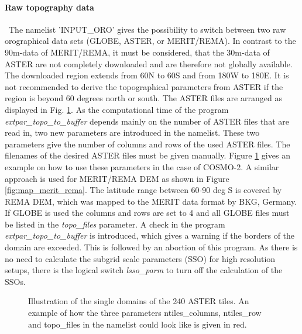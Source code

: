 \documentclass[a4paper,10pt,DIV14,BCOR1cm,titlepage,twoside]{scrartcl}
\begin{document}
\paragraph{Raw topography data}\ 
The namelist 'INPUT\_ORO' gives the possibility to switch between two raw orographical data sets (GLOBE, ASTER, or MERIT/REMA). In contrast to the 90m-data of MERIT/REMA, it must be considered, that the 30m-data of ASTER are not completely downloaded and are therefore not globally available. The downloaded region extends from 60\textdegree N to 60\textdegree S and from 180\textdegree W to 180\textdegree E. It is not recommended to derive the topographical parameters from ASTER if the region is beyond 60 degrees north or south. The ASTER files are arranged as displayed in Fig. \ref{fig:ASTER_files}. As the computational time of the program \textit{extpar\_topo\_to\_buffer} depends mainly on the number of ASTER files that are read in, two new parameters are introduced in the namelist. These two parameters give the number of columns and rows of the used ASTER files. The filenames of the desired ASTER files must be given manually. Figure \ref{fig:ASTER_files} gives an example on how to use these parameters in the case of COSMO-2. A similar approach is used for MERIT/REMA DEM as shown in Figure \ref{fig:map_merit_rema}. The latitude range between 60-90 deg S is covered by REMA DEM, which was mapped to the MERIT data format by BKG, Germany. If GLOBE is used the columns and rows are set to 4 and all GLOBE files must be listed in the \textit{topo\_files} parameter. A check in the program \textit{extpar\_topo\_to\_buffer} is introduced, which gives a warning if the borders of the domain are exceeded. This is followed by an abortion of this program. As there is no need to calculate the subgrid scale parameters (SSO) for high resolution setups, there is the logical switch \textit{lsso\_parm} to turn off the calculation of the SSOs.\par\medskip
\pgfdeclareimage[interpolate=true, height = 13.5cm]{ASTER_files}{ASTER_files}
\begin{figure}[hb!]
\begin{pgfpicture}{0cm}{0cm}{16cm}{12cm}
 \end{pgfpicture}
\caption{\label{fig:ASTER_files}Illustration of the single domains of the 240 ASTER tiles. An example of how the three parameters ntiles\_columns, ntiles\_row and topo\_files in the namelist could look like is given in red.}	
\end{figure}
\end{document}
